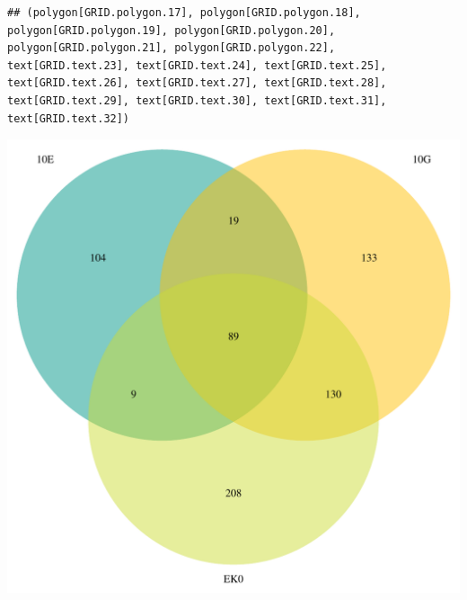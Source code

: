 \documentclass{article}\usepackage[]{graphicx}\usepackage[]{color}
\makeatletter
\newenvironment{kframe}{%
 \def\at@end@of@kframe{}%
 \ifinner\ifhmode%
  \def\at@end@of@kframe{\end{minipage}}%
  \begin{minipage}{\columnwidth}%
 \fi\fi%
 \def\FrameCommand##1{\hskip\@totalleftmargin \hskip-\fboxsep
 \colorbox{shadecolor}{##1}\hskip-\fboxsep
     \hskip-\linewidth \hskip-\@totalleftmargin \hskip\columnwidth}%
 \MakeFramed {\advance\hsize-\width
   \@totalleftmargin\z@ \linewidth\hsize
   \@setminipage}}%
 {\par\unskip\endMakeFramed%
 \at@end@of@kframe}
\newenvironment{knitrout}{}{} %
\makeatother
\begin{document}
\begin{knitrout}
\color{fgcolor}\begin{kframe}
\begin{verbatim}
## (polygon[GRID.polygon.17], polygon[GRID.polygon.18], polygon[GRID.polygon.19], polygon[GRID.polygon.20], polygon[GRID.polygon.21], polygon[GRID.polygon.22], text[GRID.text.23], text[GRID.text.24], text[GRID.text.25], text[GRID.text.26], text[GRID.text.27], text[GRID.text.28], text[GRID.text.29], text[GRID.text.30], text[GRID.text.31], text[GRID.text.32])
\end{verbatim}
\end{kframe}

{\centering \includegraphics[width=1\linewidth,height=.4\textheight]{figure/minimal-venn_alltimes_3fc_down_venn-1} 

}



\end{knitrout}
\end{document}
